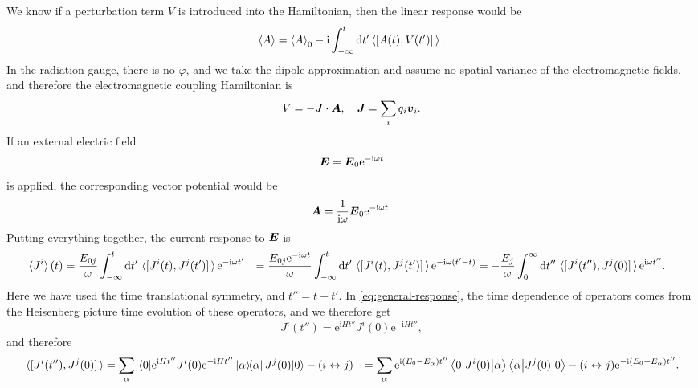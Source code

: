 \documentclass[hyperref, a4paper]{article}
\newcommand*{\ii}{\mathrm{i}}
\newcommand*{\ee}{\mathrm{e}}
\def\\{}%
\begin{document}
We know if a perturbation term $V$ is introduced into the Hamiltonian,
then the linear response would be 
\begin{equation}
    \expval{A} = \expval{A}_0 - \ii \int_{-\infty}^{t} \dd{t'} 
    \expval{\comm*{A(t)}{V(t')}}.
    \label{eq:general-response}
\end{equation}
In the radiation gauge, there is no $\varphi$, 
and we take the dipole approximation and assume no spatial variance 
of the electromagnetic fields, 
and therefore the electromagnetic coupling Hamiltonian is 
\begin{equation}
    V = - \vb*{J} \cdot \vb*{A}, \quad 
    \vb*{J} = \sum_i q_i \vb*{v}_i.
\end{equation}
If an external electric field 
\begin{equation}
    \vb*{E} = \vb*{E}_0 \ee^{- \ii \omega t} 
\end{equation}
is applied, the corresponding vector potential would be 
\begin{equation}
    \vb*{A} = \frac{1}{\ii \omega} \vb*{E}_0 \ee^{- \ii \omega t}.
\end{equation}
Putting everything together, the current response to $\vb*{E}$ is 
\begin{equation}
    \begin{aligned}
        \expval*{J^i}(t) &= \frac{E_{0j}}{\omega} \int_{-\infty}^{t} \dd{t'} \expval*{\comm*{J^i(t)}{J^j(t')}} \ee^{- \ii \omega t'} \\
        &= \frac{E_{0j} \ee^{- \ii \omega t}}{\omega} 
        \int_{-\infty}^{t} \dd{t'} \expval*{\comm*{J^i(t)}{J^j(t')}} 
        \ee^{- \ii \omega (t' - t)} \\
        &= - \frac{E_j}{\omega} \int_{0}^{\infty} \dd{t''} \expval*{\comm*{J^i(t'')}{J^j(0)}} \ee^{\ii \omega t''}.
    \end{aligned} 
    \label{eq:response-2}
\end{equation}
Here we have used the time translational symmetry, 
and $t'' = t - t'$.
In \eqref{eq:general-response}, 
the time dependence of operators 
comes from the Heisenberg picture time evolution of these operators,
and we therefore get
\[
    J^i(t'') = \ee^{\ii H t''} J^i(0) \ee^{- \ii H t''},
\] 
and therefore 
\[
    \begin{aligned}
        \expval*{\comm*{J^i(t'')}{J^j(0)}} &= 
        \sum_{\alpha} \mel{0}{\ee^{\ii H t''} J^i(0) \ee^{- \ii H t''} \dyad*{\alpha}{\alpha} J^j(0) }{0}
        - (i \leftrightarrow j) \\
        &= \sum_{\alpha} \ee^{\ii (E_0 - E_\alpha) t''}
        \mel**{0}{J^i(0)}{\alpha} \mel**{\alpha}{J^j(0)}{0} - (i \leftrightarrow j)
        \ee^{- \ii (E_0 - E_\alpha) t''}.
    \end{aligned}
\]
\end{document}
